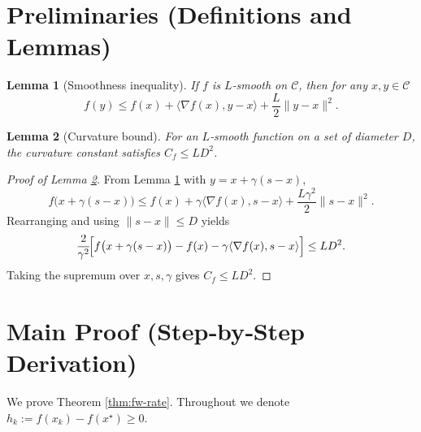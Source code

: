 \documentclass{article}
\newtheorem{lemma}{Lemma}
\newcommand{\Cset}{\mathcal{C}}
\newcommand{\opt}{x^{\star}}
\newcommand{\grad}{\nabla}
\newcommand{\inner}[2]{\langle #1,#2\rangle}
\newcommand{\norm}[1]{\|#1\|}
\begin{document}
\section*{Preliminaries (Definitions and Lemmas)}
\begin{lemma}[Smoothness inequality]\label{lem:smooth}
If $f$ is $L$‑smooth on $\Cset$, then for any $x,y\in\Cset$
\[
f(y)\le f(x)+\inner{\grad f(x)}{y-x}+\frac{L}{2}\norm{y-x}^{2}.
\tag{L1}
\]
\end{lemma}
\begin{lemma}[Curvature bound]\label{lem:curv}
For an $L$‑smooth function on a set of diameter $D$, the curvature constant satisfies $C_{f}\le L D^{2}$.
\end{lemma}
\begin{proof}[Proof of Lemma \ref{lem:curv}]
From Lemma \ref{lem:smooth} with $y=x+\gamma(s-x)$,
\[
f\bigl(x+\gamma(s-x)\bigr)\le f(x)+\gamma\inner{\grad f(x)}{s-x}+\frac{L\gamma^{2}}{2}\norm{s-x}^{2}.
\]
Rearranging and using $\norm{s-x}\le D$ yields
\[
\frac{2}{\gamma^{2}}\!\Bigl[f\bigl(x+\gamma(s-x)\bigr)-f(x)-\gamma\inner{\grad f(x)}{s-x}\Bigr]
\le L D^{2}.
\]
Taking the supremum over $x,s,\gamma$ gives $C_{f}\le L D^{2}$.
\end{proof}

\section*{Main Proof (Step‑by‑Step Derivation)}
We prove Theorem \ref{thm:fw-rate}.  Throughout we denote $h_{k}:=f(x_{k})-f(\opt)\ge0$.
\end{document}
